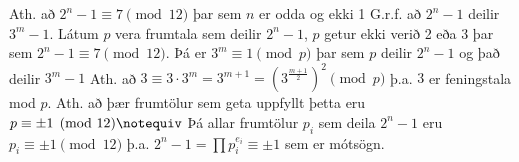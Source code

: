 Ath. að $2^n-1\equiv 7 \pmod{12}$ þar sem $n$ er odda og ekki 1
\newline G.r.f. að $2^n-1$ deilir $3^m-1$. Látum $p$ vera frumtala sem deilir $2^n-1$, $p$ getur ekki verið 2 eða 3 þar sem $2^n-1\equiv 7 \pmod{12}$.
Þá er $3^m\equiv 1 \pmod p$ þar sem $p$ deilir $2^n-1$ og það deilir $3^m-1$
\newline Ath. að $3\equiv3\cdot3^m=3^{m+1}=(3^{\frac{m+1}{2}})^2 \pmod p$ þ.a. $3$ er feningstala mod $p$.
\newline Ath. að þær frumtölur sem geta uppfyllt þetta eru $p\equiv\pm1\pmod{12}\notequiv$
\newline Þá allar frumtölur $p_i$ sem deila $2^n-1$ eru $p_i\equiv\pm1\pmod{12}$ þ.a. $2^n-1=\prod p_i^{e_i}\equiv\pm1$ sem er mótsögn.
